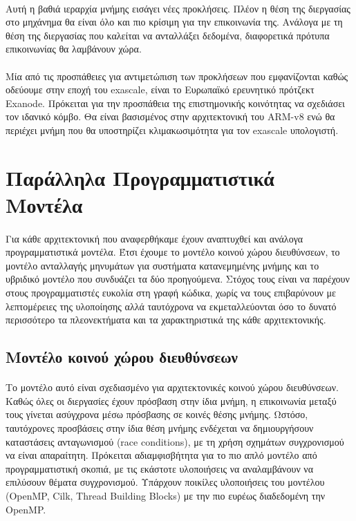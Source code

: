 \paragraph{}
Αυτή η βαθιά ιεραρχία μνήμης εισάγει νέες προκλήσεις. Πλέον η θέση της διεργασίας στο μηχάνημα θα είναι όλο και πιο κρίσιμη για την επικοινωνία της. Ανάλογα με τη θέση της διεργασίας που καλείται να ανταλλάξει δεδομένα, διαφορετικά πρότυπα επικοινωνίας θα λαμβάνουν χώρα.

\paragraph{}
Μία από τις προσπάθειες για αντιμετώπιση των προκλήσεων που εμφανίζονται καθώς οδεύουμε στην εποχή του exascale, είναι το Ευρωπαϊκό ερευνητικό πρότζεκτ Exanode. Πρόκειται για την προσπάθεια της επιστημονικής κοινότητας να σχεδιάσει τον ιδανικό κόμβο. Θα είναι βασισμένος στην αρχιτεκτονική του ARM-v8 ενώ θα περιέχει μνήμη που θα υποστηρίζει κλιμακωσιμότητα για τον exascale υπολογιστή. 

\section{Παράλληλα Προγραμματιστικά Μοντέλα}
\paragraph{}
Για κάθε αρχιτεκτονική που αναφερθήκαμε έχουν αναπτυχθεί και ανάλογα προγραμματιστικά μοντέλα. Έτσι έχουμε το μοντέλο κοινού χώρου διευθύνσεων, το μοντέλο ανταλλαγής μηνυμάτων για συστήματα κατανεμημένης μνήμης και το υβριδικό μοντέλο που συνδυάζει τα δύο προηγούμενα. Στόχος τους είναι να παρέχουν στους προγραμματιστές ευκολία στη γραφή κώδικα, χωρίς να τους επιβαρύνουν με λεπτομέρειες της υλοποίησης αλλά ταυτόχρονα να εκμεταλλεύονται όσο το δυνατό περισσότερο τα πλεονεκτήματα και τα χαρακτηριστικά της κάθε αρχιτεκτονικής.
\subsection{Μοντέλο κοινού χώρου διευθύνσεων}
\paragraph{}
Το μοντέλο αυτό είναι σχεδιασμένο για αρχιτεκτονικές κοινού χώρου διευθύνσεων. Καθώς όλες οι διεργασίες έχουν πρόσβαση στην ίδια μνήμη, η επικοινωνία μεταξύ τους γίνεται ασύγχρονα μέσω πρόσβασης σε κοινές θέσης μνήμης. Ωστόσο, ταυτόχρονες προσβάσεις στην ίδια θέση μνήμης ενδέχεται να δημιουργήσουν καταστάσεις ανταγωνισμού (race conditions), με τη χρήση σχημάτων συγχρονισμού να είναι απαραίτητη. Πρόκειται αδιαμφισβήτητα για το πιο απλό μοντέλο από προγραμματιστική σκοπιά, με τις εκάστοτε υλοποιήσεις να αναλαμβάνουν να επιλύσουν θέματα συγχρονισμού. Υπάρχουν ποικίλες υλοποιήσεις του μοντέλου (OpenMP, Cilk, Thread Building Blocks) με την πιο ευρέως διαδεδομένη την OpenMP.

